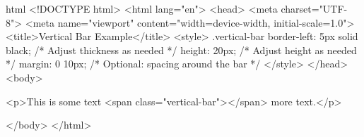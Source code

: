 html
<!DOCTYPE html>
<html lang="en">
<head>
    <meta charset="UTF-8">
    <meta name="viewport" content="width=device-width, initial-scale=1.0">
    <title>Vertical Bar Example</title>
    <style>
        .vertical-bar {
            border-left: 5px solid black; /* Adjust thickness as needed */
            height: 20px; /* Adjust height as needed */
            margin: 0 10px; /* Optional: spacing around the bar */
        }
    </style>
</head>
<body>

    <p>This is some text <span class="vertical-bar"></span> more text.</p>

</body>
</html>